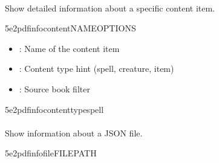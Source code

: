 \documentclass[letterpaper,10pt,english]{sphinxmanual}
\begin{document}
\paragraph{}
\label{\detokenize{user-guide/cli-reference:id1}}
\sphinxAtStartPar
Show detailed information about a specific content item.

\begin{sphinxVerbatim}[commandchars=\\\{\}]
5e2pdfinfocontentNAME\PYG{o}{[}OPTIONS\PYG{o}{]}
\end{sphinxVerbatim}

\sphinxAtStartPar
{}
\begin{itemize}
\item {} 
\sphinxAtStartPar
{}: Name of the content item

\end{itemize}

\sphinxAtStartPar
{}
\begin{itemize}
\item {} 
\sphinxAtStartPar
{}: Content type hint (spell, creature, item)

\item {} 
\sphinxAtStartPar
{}: Source book filter

\end{itemize}

\sphinxAtStartPar
{}

\begin{sphinxVerbatim}[commandchars=\\\{\}]
5e2pdfinfocontent\PYGZhy{}\PYGZhy{}typespell
\end{sphinxVerbatim}


\paragraph{}
\label{\detokenize{user-guide/cli-reference:file}}
\sphinxAtStartPar
Show information about a JSON file.

\begin{sphinxVerbatim}[commandchars=\\\{\}]
5e2pdfinfofileFILE\PYGZus{}PATH
\end{sphinxVerbatim}
\end{document}
